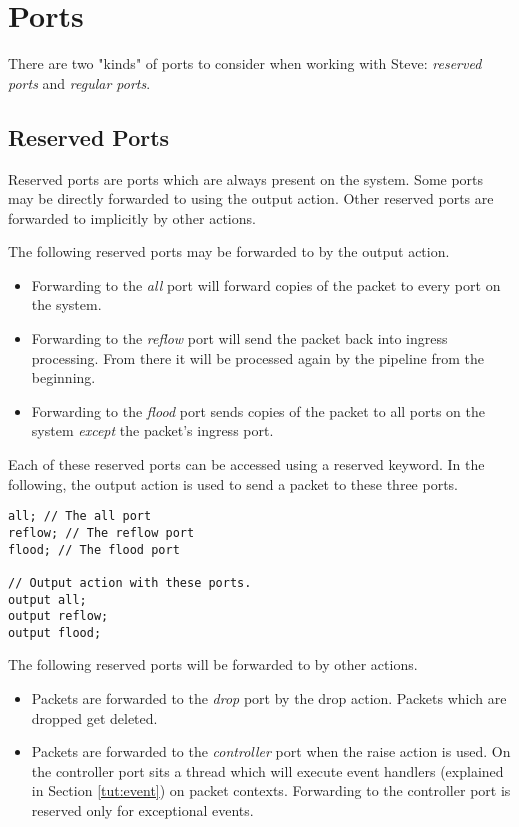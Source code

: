 \section{Ports} \label{tut:ports}

There are two "kinds" of ports to consider when working with Steve: \textit{reserved ports} and
\textit{regular ports}.

\subsection {Reserved Ports} \label{tut:reserved_ports}

Reserved ports are ports which are always present on the system. Some ports may
be directly forwarded to using the output action. Other reserved ports are forwarded to implicitly by
other actions.

The following reserved ports may be forwarded to by the output action.

\begin{itemize}
\item Forwarding to the \textit{all} port will forward copies of the packet to
every port on the system.

\item Forwarding to the \textit{reflow} port will send the packet back into
ingress processing. From there it will be processed again by the pipeline from
the beginning.

\item Forwarding to the \textit{flood} port sends copies of the packet to all
ports on the system \textit{except} the packet's ingress port.
\end{itemize}

Each of these reserved ports can be accessed using a reserved keyword. In the
following, the output action is used to send a packet to these three
ports.

\begin{codepage}
\begin{lstlisting}
all; // The all port
reflow; // The reflow port
flood; // The flood port

// Output action with these ports.
output all;
output reflow;
output flood;
\end{lstlisting}
\end{codepage}

The following reserved ports will be forwarded to by other actions.

\begin{itemize}
\item Packets are forwarded to the \textit{drop} port by the drop action.
Packets which are dropped get deleted.

\item Packets are forwarded to the \textit{controller} port when the raise
action is used. On the controller port sits a thread which will
execute event handlers (explained in Section \ref{tut:event}) on packet
contexts. Forwarding to the controller port is reserved only for exceptional
events.
\end{itemize}

